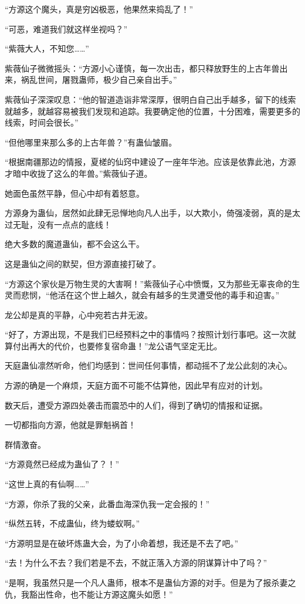 \begin{this_body}
“方源这个魔头，真是穷凶极恶，他果然来捣乱了！”

“可恶，难道我们就这样坐视吗？”

“紫薇大人，不知您……”

紫薇仙子微微摇头：“方源小心谨慎，每一次出击，都只释放野生的上古年兽出来，祸乱世间，屠戮蛊师，极少自己亲自出手。”

紫薇仙子深深叹息：“他的智道造诣非常深厚，很明白自己出手越多，留下的线索就越多，就越容易被我们发现和追踪。我要确定他的位置，十分困难，需要更多的线索，时间会很长。”

“但他哪里来那么多的上古年兽？”有蛊仙皱眉。

“根据南疆那边的情报，夏槎的仙窍中建设了一座年华池。应该是依靠此池，方源才暗中收拢了这么的年兽。”紫薇仙子道。

她面色虽然平静，但心中却有着怒意。

方源身为蛊仙，居然如此肆无忌惮地向凡人出手，以大欺小，倚强凌弱，真的是太过无耻，没有一点点的底线！

绝大多数的魔道蛊仙，都不会这么干。

这是蛊仙之间的默契，但方源直接打破了。

“方源这个家伙是万物生灵的大害啊！”紫薇仙子心中愤慨，又为那些无辜丧命的生灵而悲悯，“他活在这个世上越久，就会有越多的生灵遭受他的毒手和迫害。”

龙公却是真的平静，心中宛若古井无波。

“好了，方源出现，不是我们已经预料之中的事情吗？按照计划行事吧。这一次就算付出再大的代价，也要修复宿命蛊！”龙公语气坚定无比。

天庭蛊仙凛然听命，他们均感到：世间任何事情，都动摇不了龙公此刻的决心。

方源的确是一个麻烦，天庭方面不可能不估算他，因此早有应对的计划。

数天后，遭受方源四处袭击而震恐中的人们，得到了确切的情报和证据。

一切都指向方源，他就是罪魁祸首！

群情激奋。

“方源竟然已经成为蛊仙了？！”

“这世上真的有仙啊……”

“方源，你杀了我的父亲，此番血海深仇我一定会报的！”

“纵然五转，不成蛊仙，终为蝼蚁啊。”

“方源明显是在破坏炼蛊大会，为了小命着想，我还是不去了吧。”

“去！为什么不去？我们若是不去，不就正落入方源的阴谋算计中了吗？”

“是啊，我虽然只是一个凡人蛊师，根本不是蛊仙方源的对手。但是为了报杀妻之仇，我豁出性命，也不能让方源这魔头如愿！”


\end{this_body}
